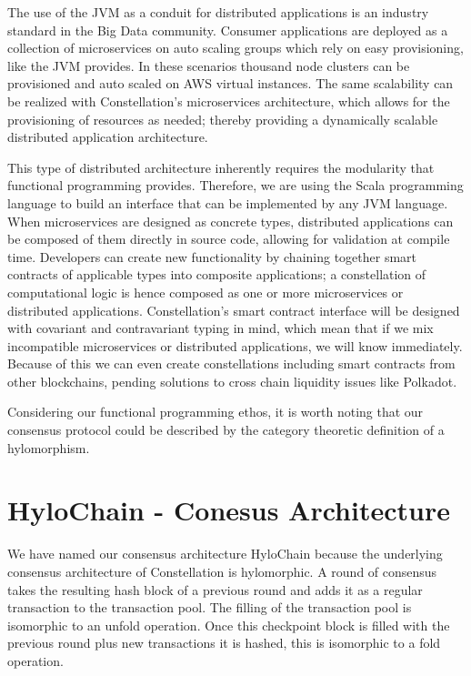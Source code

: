 \documentclass{article}
\begin{document}
The use of the JVM as a conduit for distributed applications is an industry standard in the Big Data community. Consumer applications are deployed as a collection of microservices on auto scaling groups which rely on easy provisioning, like the JVM provides. In these scenarios thousand node clusters can be provisioned and auto scaled on AWS virtual instances. The same scalability can be realized with Constellation's microservices architecture, which allows for the provisioning of resources as needed; thereby providing a dynamically scalable distributed application architecture. 

This type of distributed architecture inherently requires the modularity that functional programming provides. Therefore, we are using the Scala programming language to build an interface that can be implemented by any JVM language. When microservices are designed as concrete types, distributed applications can be composed of them directly in source code, allowing for validation at compile time. Developers can create new functionality by chaining together smart contracts of applicable types into composite applications; a constellation of computational logic is hence composed as one or more microservices or distributed applications. Constellation's smart contract interface will be designed with covariant and contravariant typing in mind, which mean that if we mix incompatible microservices or distributed applications, we will know immediately. Because of this we can even create constellations including smart contracts from other blockchains, pending solutions to cross chain liquidity issues like Polkadot.

Considering our functional programming ethos, it is worth noting that our consensus protocol could be described by the category theoretic definition of a hylomorphism.

\section{HyloChain - Conesus Architecture}
We have named our consensus architecture HyloChain because the underlying consensus architecture of Constellation is hylomorphic. A round of consensus takes the resulting hash block of a previous round and adds it as a regular transaction to the transaction pool. The filling of the transaction pool is isomorphic to an unfold operation. Once this checkpoint block is filled with the previous round plus new transactions it is hashed, this is isomorphic to a fold operation. 
\end{document}
